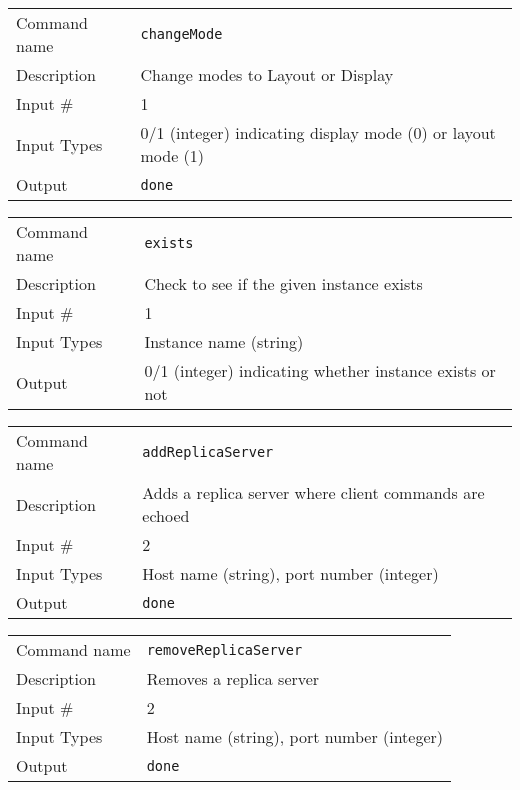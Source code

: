 \bigskip

\noindent
\begin{tabular}{l|p{5in}}
\hline
Command name & {\tt changeMode} \\
Description  & Change modes to Layout or Display \\
Input \#     & 1 \\
Input Types  & 0/1 (integer) indicating display mode (0) or layout mode (1) \\
Output       & {\tt done} \\
\hline
\end{tabular}

\bigskip

\noindent
\begin{tabular}{l|p{5in}}
\hline
Command name & {\tt exists} \\
Description  & Check to see if the given instance exists \\
Input \#     & 1 \\
Input Types  & Instance name (string) \\
Output       & 0/1 (integer) indicating whether instance exists or not \\
\hline
\end{tabular}

\bigskip

\noindent
\begin{tabular}{l|p{5in}}
\hline
Command name & {\tt addReplicaServer} \\
Description  & Adds a replica server where client commands are echoed \\
Input \#     & 2 \\
Input Types  & Host name (string), port number (integer) \\
Output       & {\tt done} \\
\hline
\end{tabular}

\bigskip

\noindent
\begin{tabular}{l|p{5in}}
\hline
Command name & {\tt removeReplicaServer} \\
Description  & Removes a replica server \\
Input \#     & 2 \\
Input Types  & Host name (string), port number (integer) \\
Output       & {\tt done} \\
\hline
\end{tabular}

